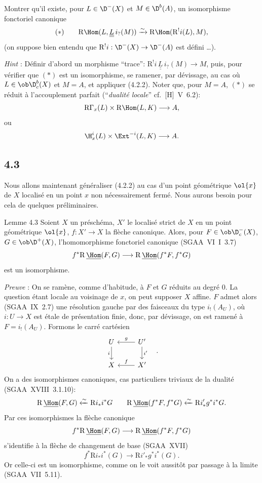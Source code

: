 Montrer qu'il existe, pour $L\in\D^-(X)$ et $M\in\D^b(A)$, un isomorphisme fonctoriel canonique
\[
(*)\qquad \mathrm{R}\Hom(L,\underline{\underline{L}}\, i_?(M))\xrightarrow{\sim}\mathrm{R}\Hom(\mathrm{R}^{!}i(L),M),
\]
(on suppose bien entendu que $\mathrm{R}^{!}i:\D^-(X)\to\D^-(A)$ est défini \dots).

\emph{Hint} : Définir d'abord un morphisme ``trace'': $\mathrm{R}^{!}i\,\underline{\underline{L}}\, i_?(M)\to M$, puis, pour vérifier que $(*)$ est un isomorphisme, se ramener, par dévissage, au cas où $L\in\ob\D_c^b(X)$ et $M=A$, et appliquer (4.2.2). Noter que, pour $M=A$, $(*)$ se réduit à l'accouplement parfait (``\emph{dualité locale}'' cf.~[H]~V~6.2):
\[
\mathrm{R}\Gamma_x(L)\times \mathrm{R}\Hom(L,K)\longrightarrow A,
\]
ou
\[
\H_x^i(L)\times \Ext^{-i}(L,K)\longrightarrow A.
\]

\subsection*{4.3}
Nous allons maintenant généraliser (4.2.2) au cas d'un point géométrique $\ol{x}$ de $X$ localisé en un point $x$ non nécessairement fermé. Nous aurons besoin pour cela de quelques préliminaires.

\begin{statement}{Lemme 4.3}
Soient $X$ un préschéma, $X'$ le localisé strict de $X$ en un point géométrique $\ol{x}$, $f:X'\to X$ la flèche canonique. Alors, pour $F\in\ob\D_c^-(X)$, $G\in\ob\D^+(X)$, l'homomorphisme fonctoriel canonique (SGAA~VI~I~3.7)
\[
f^*\mathrm{R}\,\underline{\Hom}(F,G)\longrightarrow \mathrm{R}\,\underline{\Hom}(f^*F,f^*G)
\]
est un isomorphisme.
\end{statement}

\emph{Preuve} : On se ramène, comme d'habitude, à $F$ et $G$ réduits au degré $0$. La question étant locale au voisinage de $x$, on peut supposer $X$ affine. $F$ admet alors (SGAA~IX~2.7) une résolution gauche par des faisceaux du type $i_!(A_U)$, où $i:U\to X$ est étale de présentation finie, donc, par dévissage, on est ramené à $F=i_!(A_U)$. Formons le carré cartésien
\[
\begin{tikzcd}
U \arrow[d,"i"'] & U' \arrow[l,"g"'] \arrow[d,"i'"] \\
X & X' \arrow[l,"f"']
\end{tikzcd}\quad .
\]
On a des isomorphismes canoniques, cas particuliers triviaux de la dualité (SGAA~XVIII~3.1.10):
\[
\mathrm{R}\,\underline{\Hom}(F,G)\xleftarrow{\sim}\mathrm{R} i_* i^*G
\qquad
\mathrm{R}\,\underline{\Hom}(f^*F,f^*G)\xleftarrow{\sim}\mathrm{R} i'_* g^*i^*G.
\]
Par ces isomorphismes la flèche canonique
\[
f^*\mathrm{R}\,\underline{\Hom}(F,G)\longrightarrow \mathrm{R}\,\underline{\Hom}(f^*F,f^*G)
\]
s'identifie à la flèche de changement de base (SGAA~XVII)
\[
f^*\mathrm{R} i_*i^*(G)\longrightarrow \mathrm{R} i'_*g^*i^*(G).
\]
Or
celle-ci est un isomorphisme, comme on le voit aussitôt par passage à la limite (SGAA~VII~5.11).

